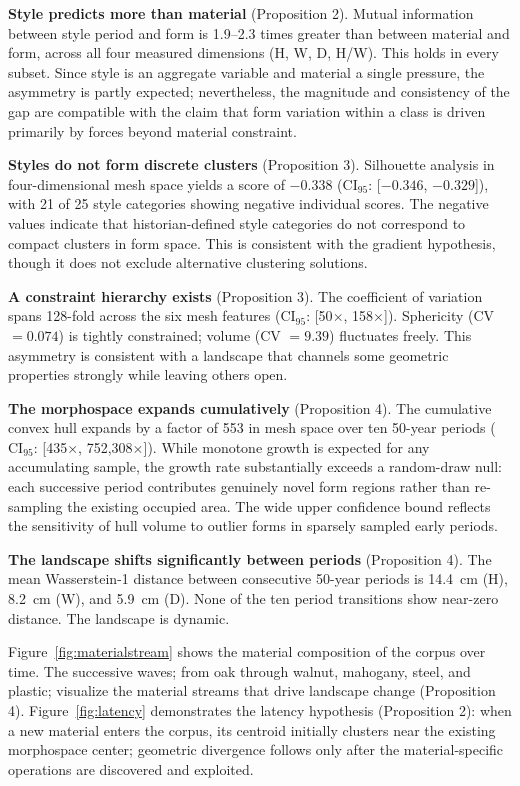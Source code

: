 \textbf{Style predicts more than material} (Proposition 2). Mutual information between style period and form is 1.9--2.3 times greater than between material and form, across all four measured dimensions (H, W, D, H/W). This holds in every subset. Since style is an aggregate variable and material a single pressure, the asymmetry is partly expected; nevertheless, the magnitude and consistency of the gap are compatible with the claim that form variation within a class is driven primarily by forces beyond material constraint.

\textbf{Styles do not form discrete clusters} (Proposition 3). Silhouette analysis in four-dimensional mesh space yields a score of $-0.338$ ($\mathrm{CI}_{95}$: [$-0.346$, $-0.329$]), with 21 of 25 style categories showing negative individual scores. The negative values indicate that historian-defined style categories do not correspond to compact clusters in form space. This is consistent with the gradient hypothesis, though it does not exclude alternative clustering solutions.

\textbf{A constraint hierarchy exists} (Proposition 3). The coefficient of variation spans 128-fold across the six mesh features ($\mathrm{CI}_{95}$: [50$\times$, 158$\times$]). Sphericity (CV $= 0.074$) is tightly constrained; volume (CV $= 9.39$) fluctuates freely. This asymmetry is consistent with a landscape that channels some geometric properties strongly while leaving others open.

\textbf{The morphospace expands cumulatively} (Proposition 4). The cumulative convex hull expands by a factor of 553 in mesh space over ten 50-year periods ($\mathrm{CI}_{95}$: [435$\times$, 752{,}308$\times$]). While monotone growth is expected for any accumulating sample, the growth rate substantially exceeds a random-draw null: each successive period contributes genuinely novel form regions rather than re-sampling the existing occupied area. The wide upper confidence bound reflects the sensitivity of hull volume to outlier forms in sparsely sampled early periods.

\textbf{The landscape shifts significantly between periods} (Proposition 4). The mean Wasserstein-1 distance between consecutive 50-year periods is 14.4~cm (H), 8.2~cm (W), and 5.9~cm (D). None of the ten period transitions show near-zero distance. The landscape is dynamic.

Figure~\ref{fig:materialstream} shows the material composition of the corpus over time. The successive waves; from oak through walnut, mahogany, steel, and plastic; visualize the material streams that drive landscape change (Proposition 4). Figure~\ref{fig:latency} demonstrates the latency hypothesis (Proposition 2): when a new material enters the corpus, its centroid initially clusters near the existing morphospace center; geometric divergence follows only after the material-specific operations are discovered and exploited.

